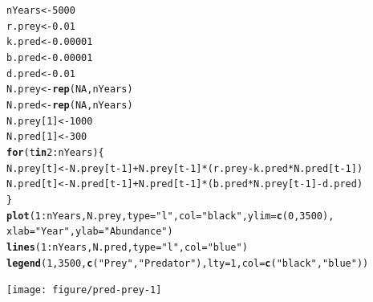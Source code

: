 \documentclass[12pt]{article}\usepackage[]{graphicx}\usepackage[]{xcolor}
\makeatletter
\newcommand{\hlnum}[1]{\textcolor[rgb]{0.686,0.059,0.569}{#1}}%
\newcommand{\hlsng}[1]{\textcolor[rgb]{0.192,0.494,0.8}{#1}}%
\newcommand{\hlopt}[1]{\textcolor[rgb]{0,0,0}{#1}}%
\newcommand{\hldef}[1]{\textcolor[rgb]{0.345,0.345,0.345}{#1}}%
\newcommand{\hlkwa}[1]{\textcolor[rgb]{0.161,0.373,0.58}{\textbf{#1}}}%
\newcommand{\hlkwb}[1]{\textcolor[rgb]{0.69,0.353,0.396}{#1}}%
\newcommand{\hlkwc}[1]{\textcolor[rgb]{0.333,0.667,0.333}{#1}}%
\newcommand{\hlkwd}[1]{\textcolor[rgb]{0.737,0.353,0.396}{\textbf{#1}}}%
\newenvironment{kframe}{%
 \def\at@end@of@kframe{}%
 \ifinner\ifhmode%
  \def\at@end@of@kframe{\end{minipage}}%
  \begin{minipage}{\columnwidth}%
 \fi\fi%
 \def\FrameCommand##1{\hskip\@totalleftmargin \hskip-\fboxsep
 \colorbox{shadecolor}{##1}\hskip-\fboxsep
     \hskip-\linewidth \hskip-\@totalleftmargin \hskip\columnwidth}%
 \MakeFramed {\advance\hsize-\width
   \@totalleftmargin\z@ \linewidth\hsize
   \@setminipage}}%
 {\par\unskip\endMakeFramed%
 \at@end@of@kframe}
\newenvironment{knitrout}{}{} %
\makeatother
\begin{document}
\begin{knitrout}
\color{fgcolor}\begin{kframe}
\begin{alltt}
\hldef{nYears} \hlkwb{<-} \hlnum{5000}
\hldef{r.prey} \hlkwb{<-} \hlnum{0.01}
\hldef{k.pred} \hlkwb{<-} \hlnum{0.00001}
\hldef{b.pred} \hlkwb{<-} \hlnum{0.00001}
\hldef{d.pred} \hlkwb{<-} \hlnum{0.01}
\hldef{N.prey} \hlkwb{<-} \hlkwd{rep}\hldef{(}\hlnum{NA}\hldef{, nYears)}
\hldef{N.pred} \hlkwb{<-} \hlkwd{rep}\hldef{(}\hlnum{NA}\hldef{, nYears)}
\hldef{N.prey[}\hlnum{1}\hldef{]} \hlkwb{<-} \hlnum{1000}
\hldef{N.pred[}\hlnum{1}\hldef{]} \hlkwb{<-} \hlnum{300}
\hlkwa{for}\hldef{(t} \hlkwa{in} \hlnum{2}\hlopt{:}\hldef{nYears) \{}
    \hldef{N.prey[t]} \hlkwb{<-} \hldef{N.prey[t}\hlopt{-}\hlnum{1}\hldef{]} \hlopt{+} \hldef{N.prey[t}\hlopt{-}\hlnum{1}\hldef{]}\hlopt{*}\hldef{(r.prey}\hlopt{-}\hldef{k.pred}\hlopt{*}\hldef{N.pred[t}\hlopt{-}\hlnum{1}\hldef{])}
    \hldef{N.pred[t]} \hlkwb{<-} \hldef{N.pred[t}\hlopt{-}\hlnum{1}\hldef{]} \hlopt{+} \hldef{N.pred[t}\hlopt{-}\hlnum{1}\hldef{]}\hlopt{*}\hldef{(b.pred}\hlopt{*}\hldef{N.prey[t}\hlopt{-}\hlnum{1}\hldef{]} \hlopt{-} \hldef{d.pred)}
\hldef{\}}
\hlkwd{plot}\hldef{(}\hlnum{1}\hlopt{:}\hldef{nYears, N.prey,} \hlkwc{type}\hldef{=}\hlsng{"l"}\hldef{,} \hlkwc{col}\hldef{=}\hlsng{"black"}\hldef{,} \hlkwc{ylim}\hldef{=}\hlkwd{c}\hldef{(}\hlnum{0}\hldef{,} \hlnum{3500}\hldef{),}
     \hlkwc{xlab}\hldef{=}\hlsng{"Year"}\hldef{,} \hlkwc{ylab}\hldef{=}\hlsng{"Abundance"}\hldef{)}
\hlkwd{lines}\hldef{(}\hlnum{1}\hlopt{:}\hldef{nYears, N.pred,} \hlkwc{type}\hldef{=}\hlsng{"l"}\hldef{,} \hlkwc{col}\hldef{=}\hlsng{"blue"}\hldef{)}
\hlkwd{legend}\hldef{(}\hlnum{1}\hldef{,} \hlnum{3500}\hldef{,} \hlkwd{c}\hldef{(}\hlsng{"Prey"}\hldef{,} \hlsng{"Predator"}\hldef{),} \hlkwc{lty}\hldef{=}\hlnum{1}\hldef{,} \hlkwc{col}\hldef{=}\hlkwd{c}\hldef{(}\hlsng{"black"}\hldef{,} \hlsng{"blue"}\hldef{))}
\end{alltt}
\end{kframe}

{\centering \texttt{[image: figure/pred-prey-1]} 

}


\end{knitrout}
\end{document}
